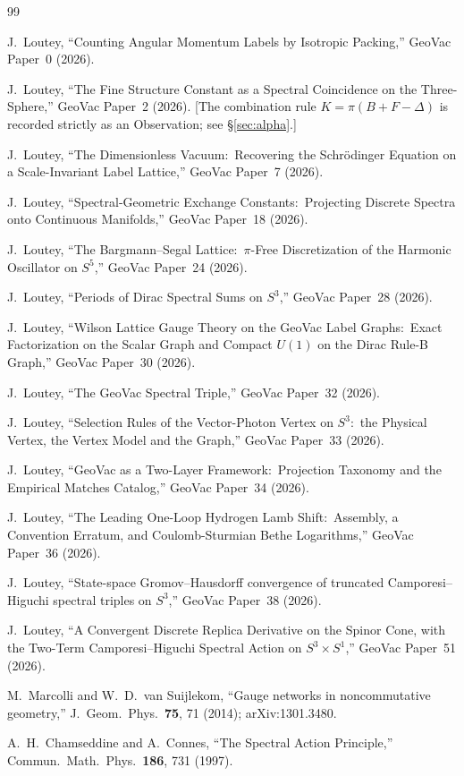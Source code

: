 \documentclass[aps,pra,twocolumn,superscriptaddress,longbibliography]{revtex4-2}
\newcommand{\gvc}[2]{#2}
\begin{document}
\begin{thebibliography}{99}

J.~Loutey,
``Counting Angular Momentum Labels by Isotropic Packing,''
GeoVac Paper~0 (2026).

J.~Loutey,
``The Fine Structure Constant as a Spectral Coincidence on the
Three-Sphere,''
GeoVac Paper~2 (2026).
[\gvc{k-combination-rule}{The combination rule $K=\pi(B+F-\Delta)$ is recorded strictly as an
Observation}; see \S\ref{sec:alpha}.]

J.~Loutey,
``The Dimensionless Vacuum:\ Recovering the Schr\"odinger Equation on
a Scale-Invariant Label Lattice,''
GeoVac Paper~7 (2026).

J.~Loutey,
``Spectral-Geometric Exchange Constants:\ Projecting Discrete Spectra
onto Continuous Manifolds,''
GeoVac Paper~18 (2026).

J.~Loutey,
``The Bargmann--Segal Lattice:\ $\pi$-Free Discretization of the
Harmonic Oscillator on $S^5$,''
GeoVac Paper~24 (2026).

J.~Loutey,
``Periods of Dirac Spectral Sums on $S^3$,''
GeoVac Paper~28 (2026).

J.~Loutey,
``Wilson Lattice Gauge Theory on the GeoVac Label Graphs:\ Exact
Factorization on the Scalar Graph and Compact $U(1)$ on the Dirac Rule-B
Graph,''
GeoVac Paper~30 (2026).

J.~Loutey,
``The GeoVac Spectral Triple,''
GeoVac Paper~32 (2026).

J.~Loutey,
``Selection Rules of the Vector-Photon Vertex on $S^3$:\ the Physical
Vertex, the Vertex Model and the Graph,''
GeoVac Paper~33 (2026).

J.~Loutey,
``GeoVac as a Two-Layer Framework:\ Projection Taxonomy and the
Empirical Matches Catalog,''
GeoVac Paper~34 (2026).

J.~Loutey,
``The Leading One-Loop Hydrogen Lamb Shift:\ Assembly, a Convention
Erratum, and Coulomb-Sturmian Bethe Logarithms,''
GeoVac Paper~36 (2026).

J.~Loutey,
``State-space Gromov--Hausdorff convergence of truncated
Camporesi--Higuchi spectral triples on $S^3$,''
GeoVac Paper~38 (2026).

J.~Loutey,
``A Convergent Discrete Replica Derivative on the Spinor Cone, with the
Two-Term Camporesi--Higuchi Spectral Action on $S^3 \times S^1$,''
GeoVac Paper~51 (2026).

M.~Marcolli and W.~D.~van Suijlekom,
``Gauge networks in noncommutative geometry,''
J.~Geom.\ Phys.\ \textbf{75}, 71 (2014); arXiv:1301.3480.

A.~H.~Chamseddine and A.~Connes,
``The Spectral Action Principle,''
Commun.\ Math.\ Phys.\ \textbf{186}, 731 (1997).

\end{thebibliography}
\end{document}
